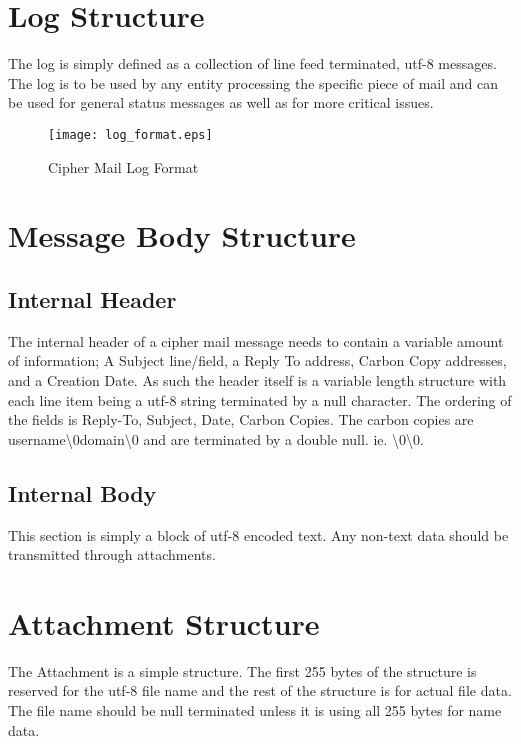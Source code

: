 \documentclass[a4paper,11pt]{article}
\begin{document}
\section{Log Structure}
The log is simply defined as a collection of line feed terminated, utf-8 messages. The log is to be used by any entity processing the specific piece of mail and can be used for general status messages as well as for more critical issues.
\begin{figure}[H]
\centering
\texttt{[image: log\_format.eps]}
\caption{Cipher Mail Log Format}
\end{figure}

\section{Message Body Structure}
\subsection{Internal Header}
The internal header of a cipher mail message needs to contain a variable amount of information; A Subject line/field, a Reply To address, Carbon Copy addresses, and a Creation Date. As such the header itself is a variable length structure with each line item being a utf-8 string terminated by a null character. The ordering of the fields is Reply-To, Subject, Date, Carbon Copies. The carbon copies are {username}{\textbackslash 0}{domain}{\textbackslash 0} and are terminated by a double null. ie. {\textbackslash 0}{\textbackslash 0}.
\subsection{Internal Body}
This section is simply a block of utf-8 encoded text. Any non-text data should be transmitted through attachments.

\section{Attachment Structure}
The Attachment is a simple structure. The first 255 bytes of the structure is reserved for the utf-8 file name and the rest of the structure is for actual file data. The file name should be null terminated unless it is using all 255 bytes for name data.
\end{document}
